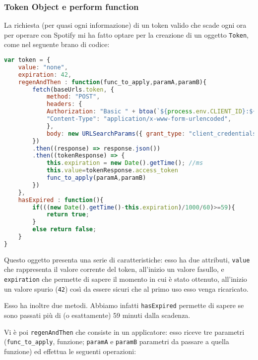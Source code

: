 \subsubsection{Token Object e perform function}
La richiesta (per quasi ogni informazione) di un token valido che scade ogni ora per operare con Spotify mi ha fatto optare per la creazione di un oggetto \verb|Token|, come nel seguente brano di codice:
\begin{lstlisting}[language=JavaScript]
var token = {
    value: "none",
    expiration: 42,
    regenAndThen : function(func_to_apply,paramA,paramB){
        fetch(baseUrls.token, {
            method: "POST",
            headers: {
            Authorization: "Basic " + btoa(`${process.env.CLIENT_ID}:${process.env.CLIENT_SECRET}`),
            "Content-Type": "application/x-www-form-urlencoded",
            },
            body: new URLSearchParams({ grant_type: "client_credentials" }),
        })
        .then((response) => response.json())
        .then((tokenResponse) => {
            this.expiration = new Date().getTime(); //ms
            this.value=tokenResponse.access_token
            func_to_apply(paramA,paramB)
        })                   
    },
    hasExpired : function(){
        if(((new Date().getTime()-this.expiration)/1000/60)>=59){
            return true;
        }
        else return false;
    }
}
\end{lstlisting}
Questo oggetto presenta una serie di caratteristiche: esso ha due attributi, \verb|value| che rappresenta il valore corrente del token, all'inizio un valore fasullo, e \verb|expiration| che permette di sapere il momento in cui è stato ottenuto, all'inizio un valore spurio (\verb|42|) così da essere sicuri che al primo uso esso venga ricaricato.

Esso ha inoltre due metodi.
Abbiamo infatti \verb|hasExpired| permette di sapere se sono passati più di (o esattamente) 59 minuti dalla scadenza.


Vi è poi \verb|regenAndThen| che consiste in un applicatore: esso riceve tre parametri (\verb|func_to_apply|, funzione; \verb|paramA| e \verb|paramB| parametri da passare a quella funzione) ed effettua le seguenti operazioni:

